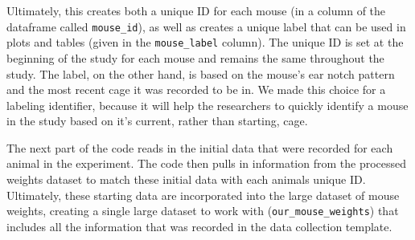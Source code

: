 \documentclass[
]{book}
\newenvironment{Shaded}{\begin{snugshade}}{\end{snugshade}}
\newcommand{\AttributeTok}[1]{\textcolor[rgb]{0.77,0.63,0.00}{#1}}
\newcommand{\CommentTok}[1]{\textcolor[rgb]{0.56,0.35,0.01}{\textit{#1}}}
\newcommand{\FunctionTok}[1]{\textcolor[rgb]{0.00,0.00,0.00}{#1}}
\newcommand{\NormalTok}[1]{#1}
\newcommand{\OtherTok}[1]{\textcolor[rgb]{0.56,0.35,0.01}{#1}}
\newcommand{\SpecialCharTok}[1]{\textcolor[rgb]{0.00,0.00,0.00}{#1}}
\newcommand{\StringTok}[1]{\textcolor[rgb]{0.31,0.60,0.02}{#1}}
\begin{document}
\begin{Shaded}
\end{Shaded}

Ultimately, this creates both a unique ID for each mouse (in a column of the
dataframe called \texttt{mouse\_id}), as well as creates a unique label that can be used
in plots and tables (given in the \texttt{mouse\_label} column). The unique ID is set at
the beginning of the study for each mouse and remains the same throughout the
study. The label, on the other hand, is based on the mouse's ear notch pattern
and the most recent cage it was recorded to be in. We made this choice for a
labeling identifier, because it will help the researchers to quickly identify a
mouse in the study based on it's current, rather than starting, cage.

The next part of the code reads in the initial data that were recorded for each
animal in the experiment. The code then pulls in information from the processed
weights dataset to match these initial data with each animals unique ID.
Ultimately, these starting data are incorporated into the large dataset of mouse
weights, creating a single large dataset to work with (\texttt{our\_mouse\_weights}) that
includes all the information that was recorded in the data collection template.
\end{document}
